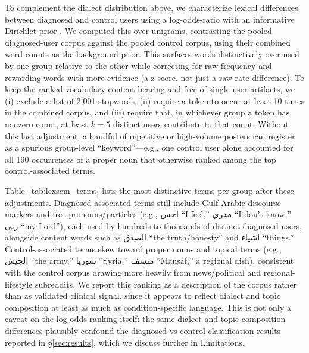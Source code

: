 \documentclass[11pt]{article}
\begin{document}
To complement the dialect distribution above, we characterize lexical differences between diagnosed and control users 
using a log-odds-ratio with an informative Dirichlet prior \citep{monroe-etal-2008-fightin}. 
We computed this over unigrams, contrasting the pooled diagnosed-user 
corpus against the pooled control corpus, 
using their combined word counts as the background prior.
This surfaces words distinctively over-used by one group relative to the other while correcting for raw 
frequency and rewarding words with more evidence (a z-score, not just a raw rate difference). 
To keep the ranked vocabulary content-bearing and free of single-user artifacts, 
we (i) exclude a list of 2,001 stopwords, (ii) require a token to occur at least 10 times in the combined corpus, and 
(iii) require that, in whichever group a token has nonzero count, at least $k{=}5$ distinct users contribute to that count. 
Without this last adjustment, a handful of repetitive or high-volume posters can register as a spurious group-level 
``keyword''---e.g., one control user alone accounted for all 190 occurrences of a proper noun that otherwise ranked 
among the top control-associated terms.

Table~\ref{tab:lexsem_terms} lists the most distinctive terms per group after these adjustments. Diagnosed-associated terms still include Gulf-Arabic discourse markers and free pronouns/particles (e.g., \foreignlanguage{arabic}{احس} ``I feel,'' \foreignlanguage{arabic}{مدري} ``I don't know,'' \foreignlanguage{arabic}{ربي} ``my Lord''), each used by hundreds to thousands of distinct diagnosed users, alongside content words such as \foreignlanguage{arabic}{الصدق} ``the truth/honesty'' and \foreignlanguage{arabic}{اشياء} ``things.'' Control-associated terms skew toward proper nouns and topical terms (e.g., \foreignlanguage{arabic}{الجيش} ``the army,'' \foreignlanguage{arabic}{سوريا} ``Syria,'' \foreignlanguage{arabic}{منسف} ``Mansaf,'' a regional dish), consistent with the control corpus drawing more heavily from news/political and regional-lifestyle subreddits. We report this ranking as a description of the corpus rather than as validated clinical signal, since it appears to reflect dialect and topic composition at least as much as condition-specific language. This is not only a caveat on the log-odds ranking itself: the same dialect and topic composition differences plausibly confound the diagnosed-vs-control classification results reported in §\ref{sec:results}, which we discuss further in Limitations.
\end{document}
